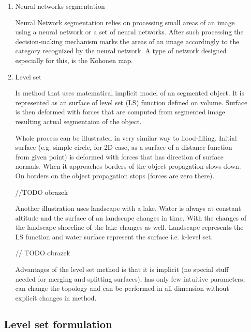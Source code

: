 \begin{enumerate}
  \item  Neural networks segmentation

  Neural Network segmentation relies on processing small areas of an image using a neural network or a set of neural networks. After such processing the decision-making mechanism marks the areas of an image accordingly to the category recognized by the neural network. A type of network designed especially for this, is the Kohonen map.

  \item Level set

Is method that uses matematical implicit model of an segmented object. It is represented as an surface of level set (LS) function defined on volume. Surface is then deformed with forces that are computed from segmented image resulting actual segmentaion of the object.

Whole process can be illustrated in very similar way to flood-filling. Initial surface (e.g. simple circle, for 2D case, as a surface of a distance function from given point) is deformed with forces that has direction of surface normals. When it approaches borders of the object propagation slows down. On borders on the object propagation stops (forces are zero there).

//TODO obrazek

Another illustration uses landscape with a lake. Water is always at constant altitude and the surface of an landscape changes in time. With the changes of the landscape shoreline of the lake changes as well. Landscape represents the LS function and water surface represent the surface i.e. k-level set.

// TODO obrazek

Advantages of the level set method is that it is implicit (no special stuff needed for merging and splitting surfaces), has only few intuitive parameters, can change the topology and can be performed in all dimension without explicit changes in method. 

\end{enumerate}

\subsection{Level set formulation}

